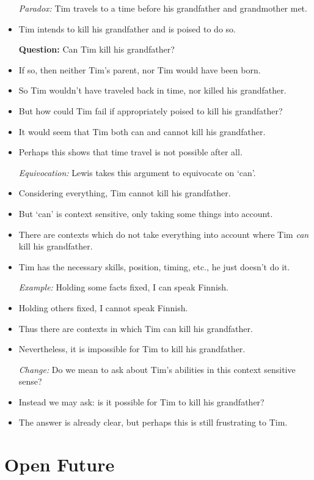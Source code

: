 \documentclass[a4paper, 11pt]{article} %
\begin{document}
\begin{itemize}
  \item[\it Paradox:] Tim travels to a time before his grandfather and grandmother met.
    \item Tim intends to kill his grandfather and is poised to do so.
  \item[\bf Question:] Can Tim kill his grandfather?
    \item If so, then neither Tim's parent, nor Tim would have been born.
    \item So Tim wouldn't have traveled back in time, nor killed his grandfather.
    \item But how could Tim fail if appropriately poised to kill his grandfather?
    \item It would seem that Tim both can and cannot kill his grandfather.
    \item Perhaps this shows that time travel is not possible after all. 
  \item[\it Equivocation:] Lewis takes this argument to equivocate on `can'.
    \item Considering everything, Tim cannot kill his grandfather.
    \item But `can' is context sensitive, only taking some things into account.
    \item There are contexts which do not take everything into account where Tim \textit{can} kill his grandfather.
    \item Tim has the necessary skills, position, timing, etc., he just doesn't do it.
  \item[\it Example:] Holding some facts fixed, I can speak Finnish.
    \item Holding others fixed, I cannot speak Finnish.
    \item Thus there are contexts in which Tim can kill his grandfather. 
    \item Nevertheless, it is impossible for Tim to kill his grandfather.
  \item[\it Change:] Do we mean to ask about Tim's abilities in this context sensitive sense?
    \item Instead we may ask: is it possible for Tim to kill his grandfather?
    \item The answer is already clear, but perhaps this is still frustrating to Tim.
\end{itemize}





\section*{Open Future}
\end{document}
